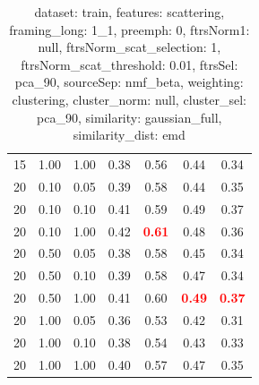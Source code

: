 \begin{table}
\begin{center}
\begin{tabular}{lllcccc}
15 & 1.00 & 1.00 & 0.38 & 0.56 & 0.44 & 0.34 \\ 
20 & 0.10 & 0.05 & 0.39 & 0.58 & 0.44 & 0.35 \\ 
20 & 0.10 & 0.10 & 0.41 & 0.59 & 0.49 & 0.37 \\ 
20 & 0.10 & 1.00 & 0.42 & \textbf{\textcolor{red}{0.61}} & 0.48 & 0.36 \\ 
20 & 0.50 & 0.05 & 0.38 & 0.58 & 0.45 & 0.34 \\ 
20 & 0.50 & 0.10 & 0.39 & 0.58 & 0.47 & 0.34 \\ 
20 & 0.50 & 1.00 & 0.41 & 0.60 & \textbf{\textcolor{red}{0.49}} & \textbf{\textcolor{red}{0.37}} \\ 
20 & 1.00 & 0.05 & 0.36 & 0.53 & 0.42 & 0.31 \\ 
20 & 1.00 & 0.10 & 0.38 & 0.54 & 0.43 & 0.33 \\ 
20 & 1.00 & 1.00 & 0.40 & 0.57 & 0.47 & 0.35 \\ 
\end{tabular} 
\end{center} 
\caption{dataset: train, features: scattering, framing\_long: 1\_1, preemph: 0, ftrsNorm1: null, ftrsNorm\_scat\_selection: 1, ftrsNorm\_scat\_threshold: 0.01, ftrsSel: pca\_90, sourceSep: nmf\_beta, weighting: clustering, cluster\_norm: null, cluster\_sel: pca\_90, similarity: gaussian\_full, similarity\_dist: emd} 
\label{datasetrFeaturscFraminlong1_1Preemp0Ftrsnorm1nuFtrsnoscatselect1Ftrsnoscatthresh0.01Ftrsselpc90SourcesepnmbeWeightclClustenormnuClusteselpc90SimilagafuSimiladistem} 
\end{table} 
 
  
\clearpage 
  
